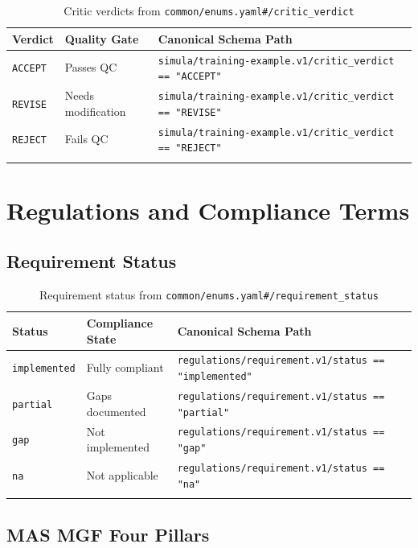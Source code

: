 \documentclass[11pt,a4paper]{report}
\newcommand{\schemapath}[1]{\texttt{\textcolor{pathcolor}{#1}}}
\newcommand{\enumval}[1]{\texttt{\textcolor{sapgreen}{#1}}}
\begin{document}
\begin{longtable}{@{}p{2cm}p{4cm}p{6cm}@{}}
\toprule
\textbf{Verdict} & \textbf{Quality Gate} & \textbf{Canonical Schema Path} \\
\midrule
\endhead
\enumval{ACCEPT} & Passes QC & \schemapath{simula/training-example.v1/critic\_verdict == "ACCEPT"} \\
\enumval{REVISE} & Needs modification & \schemapath{simula/training-example.v1/critic\_verdict == "REVISE"} \\
\enumval{REJECT} & Fails QC & \schemapath{simula/training-example.v1/critic\_verdict == "REJECT"} \\
\bottomrule
\caption{Critic verdicts from \schemapath{common/enums.yaml\#/critic\_verdict}}
\end{longtable}

\chapter{Regulations and Compliance Terms}

\section{Requirement Status}

\begin{longtable}{@{}p{2.5cm}p{3.5cm}p{6cm}@{}}
\toprule
\textbf{Status} & \textbf{Compliance State} & \textbf{Canonical Schema Path} \\
\midrule
\endhead
\enumval{implemented} & Fully compliant & \schemapath{regulations/requirement.v1/status == "implemented"} \\
\enumval{partial} & Gaps documented & \schemapath{regulations/requirement.v1/status == "partial"} \\
\enumval{gap} & Not implemented & \schemapath{regulations/requirement.v1/status == "gap"} \\
\enumval{na} & Not applicable & \schemapath{regulations/requirement.v1/status == "na"} \\
\bottomrule
\caption{Requirement status from \schemapath{common/enums.yaml\#/requirement\_status}}
\end{longtable}

\section{MAS MGF Four Pillars}
\end{document}

